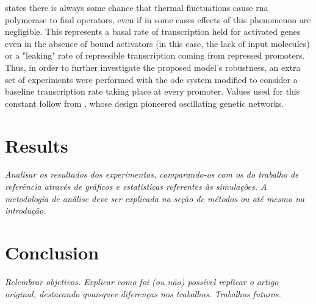   \citet{ingalls} states there is always some chance that thermal fluctuations cause \acs{rna} polymerase to find operators, even if in some cases effects of this phenomenon are negligible.
  This represents a basal rate of transcription held for activated genes even in the absence of bound activators (in this case, the lack of input molecules) or a "leaking" rate of repressible transcription coming from repressed promoters.
  Thus, in order to further investigate the proposed model's robustness, an extra set of experiments were performed with the \ac{ode} system modified to consider a baseline transcription rate taking place at every promoter.
  Values used for this constant follow from \citet{repressilator}, whose design pioneered oscillating genetic networks.


\section{Results}

  \textit{Analisar os resultados dos experimentos, comparando-os com os do trabalho de referência através de gráficos e estatísticas referentes às simulações.
  A metodologia de análise deve ser explicada na seção de métodos ou até mesmo na introdução.}


\section{Conclusion}


  \textit{Relembrar objetivos.
  Explicar como foi (ou não) possível replicar o artigo original, destacando quaisquer diferenças nos trabalhos.
  Trabalhos futuros.}
